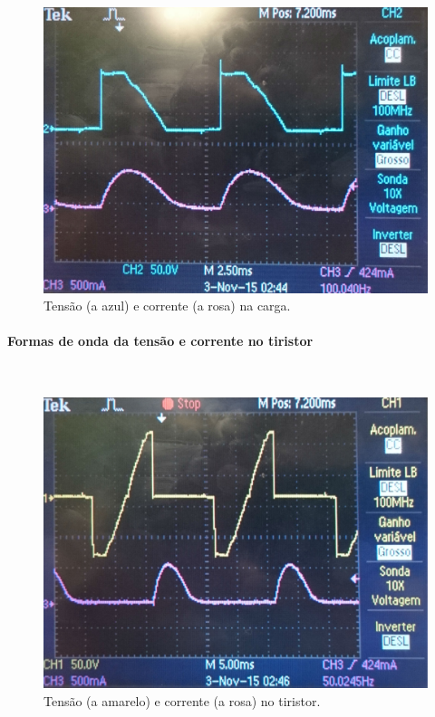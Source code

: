 \documentclass[a4paper,11pt]{article}
\numberwithin{equation}{section}
\begin{document}
\begin{figure}[H]
	\centering
	\includegraphics[keepaspectratio=true, scale=0.13]{img/DSC_0191}
	\caption{Tensão (a azul) e corrente (a rosa) na carga.}
	\label{fig:tccargasemi}
	\vspace{-0.8em}
\end{figure}

\paragraph{Formas de onda da tensão e corrente no tiristor} \mbox{}\

\begin{figure}[H]
	\centering
	\includegraphics[keepaspectratio=true, scale=0.12]{img/DSC_0192}
	\caption{Tensão (a amarelo) e corrente (a rosa) no tiristor.}
	\label{fig:tctiristorsemi}
	\vspace{-0.8em}
\end{figure}
\end{document}
